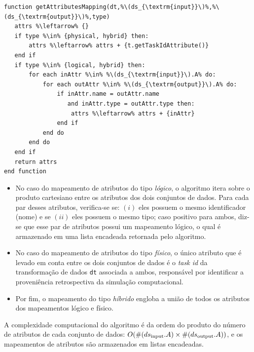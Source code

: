\begin{minipage}[c]{0.95\textwidth}
\begin{lstlisting}[language=pseudocode,label={lst:algorithm-attribute-mappings},caption={[Obtenção de múltiplos mapeamentos de atributos]Obtenção de múltiplos mapeamentos de atributos entre dois conjuntos de dados adjacentes.}]
function getAttributesMapping(dt,%\(ds_{\textrm{input}}\)%,%\(ds_{\textrm{output}}\)%,type)
   attrs %\leftarrow% {}
   if type %\in% {physical, hybrid} then:
       attrs %\leftarrow% attrs + {t.getTaskIdAttribute()}
   end if
   if type %\in% {logical, hybrid} then:
       for each inAttr %\in% %\(ds_{\textrm{input}}\).A% do:
           for each outAttr %\in% %\(ds_{\textrm{output}}\).A% do:
               if inAttr.name = outAttr.name
                  and inAttr.type = outAttr.type then:
                   attrs %\leftarrow% attrs + {inAttr}
               end if
           end do
       end do
   end if
   return attrs
end function
\end{lstlisting}
\end{minipage}

\begin{itemize}
    \item No caso do mapeamento de atributos do tipo \emph{lógico}, o algoritmo itera sobre o produto cartesiano entre os atributos dos dois conjuntos de dados. Para cada par desses atributos, verifica-se se: \((i)\) eles possuem o mesmo identificador (nome) e se \((ii)\) eles possuem o mesmo tipo; caso positivo para ambos, diz-se que esse par de atributos possui um mapeamento lógico, o qual é armazenado em uma lista encadeada retornada pelo algoritmo.

    \item No caso do mapeamento de atributos do tipo \emph{físico}, o único atributo que é levado em conta entre os dois conjuntos de dados é o \textit{task id} da transformação de dados \texttt{dt} associada a ambos, responsável por identificar a proveniência retrospectiva da simulação computacional.

    \item Por fim, o mapeamento do tipo \emph{híbrido} engloba a união de todos os atributos dos mapeamentos lógico e físico.
\end{itemize}

A complexidade computacional do algoritmo é da ordem do produto do número de atributos de cada conjunto de dados: \(O(\#(ds_{\textup{input}}.A) \times \#(ds_{\textup{output}}.A))\), e os mapeamentos de atributos são armazenados em listas encadeadas.

